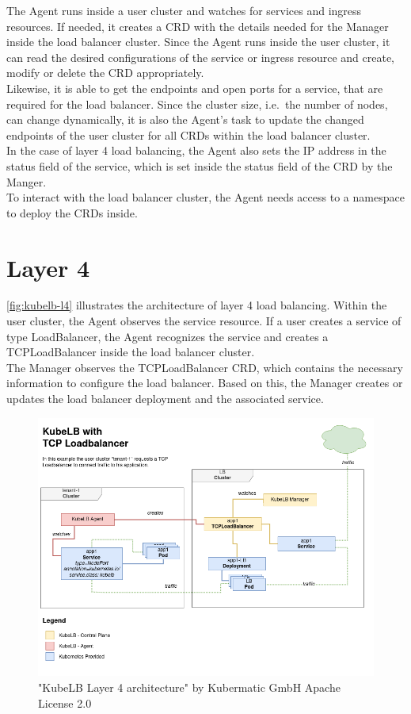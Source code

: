 The Agent runs inside a user cluster and watches for services and ingress resources.
If needed, it creates a CRD with the details needed for the Manager inside the load balancer cluster.
Since the Agent runs inside the user cluster, it can read the desired configurations of the service or ingress resource and create, modify or delete the CRD appropriately.
\\
Likewise, it is able to get the endpoints and open ports for a service, that are required for the load balancer.
Since the cluster size, i.e.\ the number of nodes, can change dynamically, it is also the Agent's task to update the changed endpoints of the user cluster for all CRDs within the load balancer cluster.
\\
In the case of layer 4 load balancing, the Agent also sets the IP address in the status field of the service, which is set inside the status field of the CRD by the Manger.
\\
To interact with the load balancer cluster, the Agent needs access to a namespace to deploy the CRDs inside.

\section{Layer 4}

\autoref{fig:kubelb-l4} illustrates the architecture of layer 4 load balancing.
Within the user cluster, the Agent observes the service resource.
If a user creates a service of type LoadBalancer, the Agent recognizes the service and creates a TCPLoadBalancer inside the load balancer cluster.
\\
The Manager observes the TCPLoadBalancer CRD, which contains the necessary information to configure the load balancer.
Based on this, the Manager creates or updates the load balancer deployment and the associated service.


\begin{figure}[H]
    \centering
    \includegraphics[width=1\linewidth]{media/06/kubelb-l4}
    \caption{"KubeLB Layer 4 architecture" by Kubermatic GmbH Apache License 2.0}
    \label{fig:kubelb-l4}
\end{figure}

